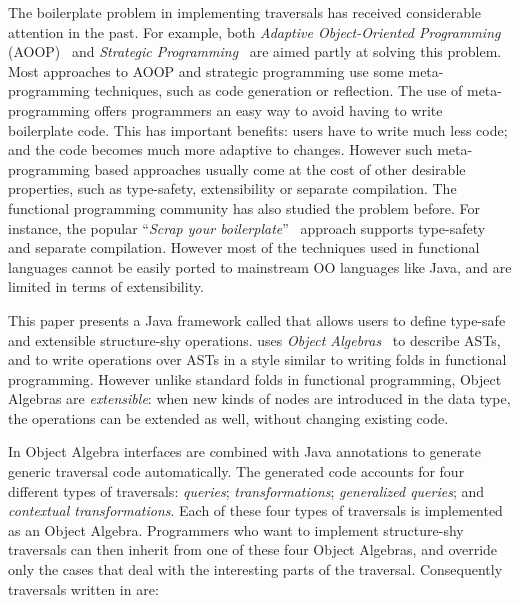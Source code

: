The boilerplate problem in implementing traversals has received
considerable attention in the past. For example, both \emph{Adaptive
  Object-Oriented Programming} (AOOP)~\cite{DemeterBook} and
\emph{Strategic Programming}~\cite{borovansky1996elan,visser1998core}
are aimed partly at solving this problem. Most approaches to AOOP and
strategic programming use some meta-programming techniques, such as
code generation or reflection. The use of meta-programming offers
programmers an easy way to avoid having to write boilerplate code.
This has important benefits: users have to write much less code; and
the code becomes much more adaptive to changes.
However such meta-programming based approaches usually come at the cost of
other desirable properties, such as type-safety, extensibility or
separate compilation. The functional programming community has also
studied the problem before. For instance, the popular ``\emph{Scrap your
boilerplate}''~\cite{ralf03syb} approach supports type-safety and
separate compilation. However most of the techniques used in
functional languages cannot be easily ported to mainstream OO
languages like Java, and are limited in terms of extensibility.



This paper presents a Java framework called \name that allows users to
define type-safe and extensible structure-shy operations. \name
uses \emph{Object Algebras}~\cite{bruno12oa} to describe ASTs, and to
write operations over ASTs in a style similar to writing folds in
functional programming. However unlike standard folds in
functional programming, Object Algebras are
\emph{extensible}: when new kinds of nodes are introduced in the data type, the operations can be extended as well, without changing existing code.

In \name Object Algebra interfaces are combined
with Java annotations to generate generic traversal code automatically. The
generated code accounts for four different types of traversals:
\emph{queries}; \emph{transformations}; \emph{generalized queries};
and \emph{contextual transformations}.  Each of these four types of
traversals is implemented as an Object Algebra. Programmers who want
to implement structure-shy traversals can then inherit from one of these
four Object Algebras, and override only the cases that deal with
the interesting parts of the traversal. Consequently
traversals written in \name are:

